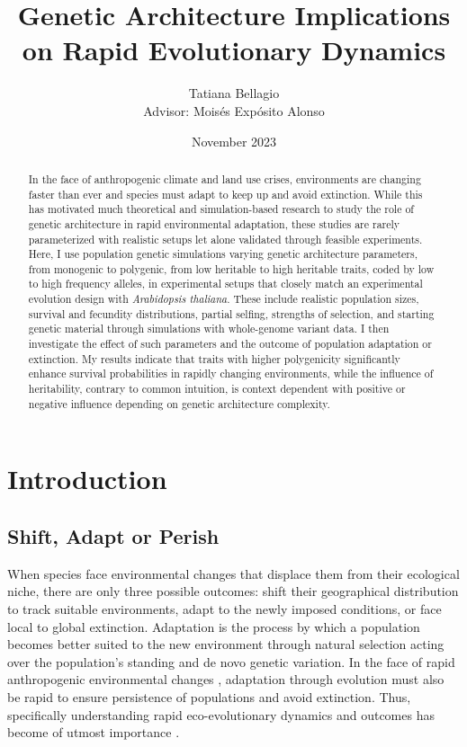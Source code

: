 \documentclass{article}
\title{Genetic Architecture Implications on Rapid Evolutionary Dynamics} %
\author{Tatiana Bellagio \\ Advisor: Moisés Expósito Alonso}
\date{November 2023}
\begin{document}
\maketitle

\begin{abstract}
In the face of anthropogenic climate and land use crises, environments are changing faster than ever and species must adapt to keep up and avoid extinction. While this has motivated much theoretical and simulation-based research to study the role of genetic architecture in rapid environmental adaptation, these studies are rarely parameterized with realistic setups let alone validated through feasible experiments. Here, I use population genetic simulations varying genetic architecture parameters, from monogenic to polygenic, from low heritable to high heritable traits, coded by low to high frequency alleles, in experimental setups that closely match an experimental evolution design with \textit{Arabidopsis thaliana}. These include realistic population sizes, survival and fecundity distributions, partial selfing, strengths of selection, and starting genetic material through simulations with whole-genome variant data. I then investigate the effect of such parameters and the outcome of population adaptation or extinction. My results indicate that traits with higher polygenicity significantly enhance survival probabilities in rapidly changing environments, while the influence of heritability, contrary to common intuition, is context dependent with positive or negative influence depending on genetic architecture complexity.
\end{abstract}

\tableofcontents
\newpage %

\section{Introduction}
\subsection{Shift, Adapt or Perish}
When species face environmental changes that displace them from their ecological niche, there are only three possible outcomes: shift their geographical distribution to track suitable environments, adapt to the newly imposed conditions, or face local to global extinction. Adaptation is the process by which a population becomes better suited to the new environment through natural selection acting over the population's standing and de novo genetic variation. In the face of rapid anthropogenic  environmental changes \citep{IPCC2023}, adaptation through evolution must also be rapid to ensure persistence of populations and avoid extinction. Thus, specifically understanding rapid eco-evolutionary dynamics and outcomes has become of utmost importance \citep{Waldvogel2020-dh, Palumbi2002-li, Stockwell2003-da}. 
\end{document}
